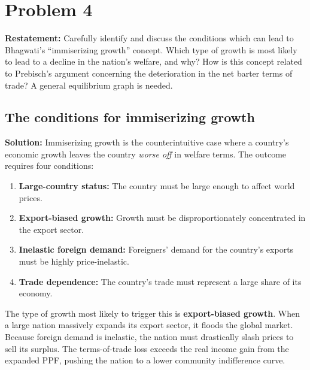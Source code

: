 \documentclass[11pt, letterpaper]{article}
\begin{document}
\vspace{1em}
\section*{Problem 4}

\textbf{Restatement:} Carefully identify and discuss the conditions which can lead to Bhagwati's ``immiserizing growth'' concept. Which type of growth is most likely to lead to a decline in the nation's welfare, and why? How is this concept related to Prebisch's argument concerning the deterioration in the net barter terms of trade? A general equilibrium graph is needed.

\subsection*{The conditions for immiserizing growth}
\noindent \textbf{Solution:} Immiserizing growth is the counterintuitive case where a country's economic growth leaves the country \textit{worse off} in welfare terms. The outcome requires four conditions:
\begin{enumerate}
  \item \textbf{Large-country status:} The country must be large enough to affect world prices.
  \item \textbf{Export-biased growth:} Growth must be disproportionately concentrated in the export sector.
  \item \textbf{Inelastic foreign demand:} Foreigners' demand for the country's exports must be highly price-inelastic.
  \item \textbf{Trade dependence:} The country's trade must represent a large share of its economy.
\end{enumerate}

\noindent The type of growth most likely to trigger this is \textbf{export-biased growth}. When a large nation massively expands its export sector, it floods the global market. Because foreign demand is inelastic, the nation must drastically slash prices to sell its surplus. The terms-of-trade loss exceeds the real income gain from the expanded PPF, pushing the nation to a lower community indifference curve.
\end{document}
